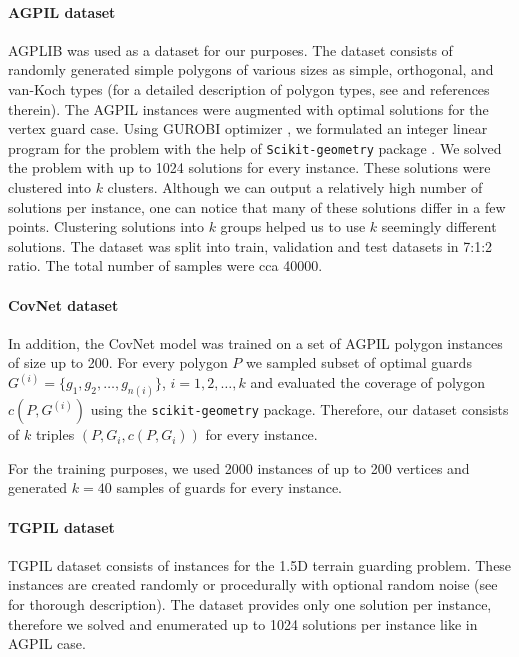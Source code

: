 \documentclass{article}
\begin{document}
\paragraph{AGPIL dataset}
AGPLIB \cite{art-gallery-instances-page} was used as a dataset for our purposes. The dataset consists of randomly generated simple polygons of various sizes as simple, orthogonal, and van-Koch types (for a detailed description of polygon types, see \cite{art-gallery-instances-page} and references therein). The AGPIL instances were augmented with optimal solutions for the vertex guard case. Using GUROBI  optimizer \cite{tools:gurobi}, we formulated an integer linear program for the problem with the help of \texttt{Scikit-geometry} package \cite{tools:scikit-geometry}. We solved the problem with up to 1024 solutions for every instance. These solutions were clustered into $k$ clusters. Although we can output a relatively high number of solutions per instance, one can notice that many of these solutions differ in a few points. Clustering solutions into $k$ groups helped us to use $k$ seemingly different solutions.
The dataset was split into train, validation and test datasets in 7:1:2 ratio. The total number of samples were cca 40000. 


\paragraph{CovNet dataset}
In addition, the CovNet model was trained on a set of AGPIL polygon instances of size up to 200. For every polygon $P$ we sampled subset of optimal guards $G^{(i)}=\{g_1,g_2,\ldots,g_{n(i)}\}$, $i=1,2,\ldots,k$ and evaluated the coverage of polygon $c(P,G^{(i)})$ using the  \texttt{scikit-geometry} package. Therefore, our dataset consists of $k$ triples $(P,G_i,c(P,G_i))$ for every instance.

For the training purposes, we used 2000 instances of up to 200 vertices and generated $k=40$ samples of guards for every instance. 


\paragraph{TGPIL dataset}
TGPIL dataset \cite{tgpil} consists of instances for the 1.5D terrain guarding problem. These instances are created randomly or procedurally with optional random noise (see \cite{tgpil} for thorough description). The dataset provides only one solution per instance, therefore we solved and enumerated up to 1024 solutions per instance like in AGPIL case.
\end{document}
